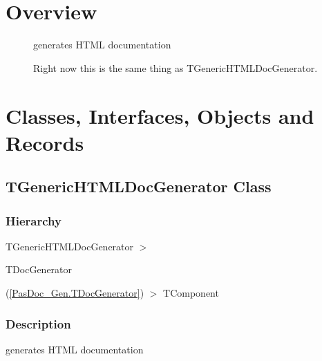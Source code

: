 \documentclass{report}
\newif\ifpdf
\begin{document}
\section{Overview}
\begin{description}
\item[\texttt{\begin{ttfamily}TGenericHTMLDocGenerator\end{ttfamily} Class}]generates HTML documentation
\item[\texttt{\begin{ttfamily}THTMLDocGenerator\end{ttfamily} Class}]Right now this is the same thing as TGenericHTMLDocGenerator.
\end{description}
\section{Classes, Interfaces, Objects and Records}
\ifpdf
\subsection*{\large{\textbf{TGenericHTMLDocGenerator Class}}\normalsize\hspace{1ex}\hrulefill}
\else
\subsection*{TGenericHTMLDocGenerator Class}
\fi
\label{PasDoc_GenHtml.TGenericHTMLDocGenerator}
\subsubsection*{\large{\textbf{Hierarchy}}\normalsize\hspace{1ex}\hfill}
TGenericHTMLDocGenerator {$>$} \begin{ttfamily}TDocGenerator\end{ttfamily}(\ref{PasDoc_Gen.TDocGenerator}) {$>$} 
TComponent
\subsubsection*{\large{\textbf{Description}}\normalsize\hspace{1ex}\hfill}
generates HTML documentation\hfill\vspace*{1ex}
\end{document}
